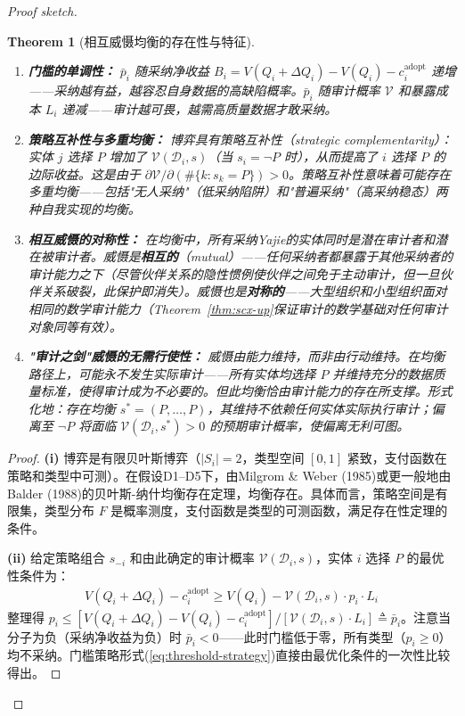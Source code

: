 \documentclass[12pt,a4paper]{ctexart}
\newtheorem{theorem}{Theorem}[section]
\theoremstyle{definition}
\theoremstyle{remark}
\begin{document}
\begin{proof}[Proof sketch]
\begin{theorem}[相互威慑均衡的存在性与特征]
\begin{enumerate}[label=(\roman*), itemsep=6pt]
\item \textbf{门槛的单调性：} $\bar{p}_i$ 随采纳净收益 $B_i = V(Q_i + \Delta Q_i) - V(Q_i) - c_i^{\text{adopt}}$ 递增——采纳越有益，越容忍自身数据的高缺陷概率。$\bar{p}_i$ 随审计概率 $\mathcal{V}$ 和暴露成本 $L_i$ 递减——审计越可畏，越需高质量数据才敢采纳。

\item \textbf{策略互补性与多重均衡：} 博弈具有策略互补性（strategic complementarity）：实体 $j$ 选择 $P$ 增加了 $\mathcal{V}(\mathcal{D}_i, s)$（当 $s_i = \neg P$ 时），从而提高了 $i$ 选择 $P$ 的边际收益。这是由于 $\partial \mathcal{V} / \partial (\#\{k: s_k = P\}) > 0$。策略互补性意味着可能存在多重均衡——包括"无人采纳"（低采纳陷阱）和"普遍采纳"（高采纳稳态）两种自我实现的均衡。

\item \textbf{相互威慑的对称性：} 在均衡中，\textit{所有}采纳Yajie的实体同时是潜在审计者和潜在被审计者。威慑是\textbf{相互的}（mutual）——任何采纳者都暴露于其他采纳者的审计能力之下（尽管伙伴关系的隐性惯例使伙伴之间免于主动审计，但一旦伙伴关系破裂，此保护即消失）。威慑也是\textbf{对称的}——大型组织和小型组织面对相同的数学审计能力（Theorem~\ref{thm:scx-up}保证审计的数学基础对任何审计对象同等有效）。

\item \textbf{"审计之剑"威慑的无需行使性：} 威慑由\textit{能力}维持，而非由\textit{行动}维持。在均衡路径上，可能\textit{永不}发生实际审计——所有实体均选择 $P$ 并维持充分的数据质量标准，使得审计成为不必要的。但此均衡恰由审计能力的存在所支撑。形式化地：存在均衡 $s^* = (P, \ldots, P)$，其维持不依赖任何实体实际执行审计；偏离至 $\neg P$ 将面临 $\mathcal{V}(\mathcal{D}_i, s^*) > 0$ 的预期审计概率，使偏离无利可图。
\end{enumerate}
\end{theorem}

\begin{proof}
\textbf{(i)} 博弈是有限贝叶斯博弈（$|S_i| = 2$，类型空间 $[0,1]$ 紧致，支付函数在策略和类型中可测）。在假设D1--D5下，由Milgrom \& Weber (1985)或更一般地由Balder (1988)的贝叶斯-纳什均衡存在定理，均衡存在。具体而言，策略空间是有限集，类型分布 $F$ 是概率测度，支付函数是类型的可测函数，满足存在性定理的条件。

\textbf{(ii)} 给定策略组合 $s_{-i}$ 和由此确定的审计概率 $\mathcal{V}(\mathcal{D}_i, s)$，实体 $i$ 选择 $P$ 的最优性条件为：
\begin{align}
V(Q_i + \Delta Q_i) - c_i^{\text{adopt}} \geq V(Q_i) - \mathcal{V}(\mathcal{D}_i, s) \cdot p_i \cdot L_i
\end{align}
整理得 $p_i \leq [V(Q_i + \Delta Q_i) - V(Q_i) - c_i^{\text{adopt}}] / [\mathcal{V}(\mathcal{D}_i, s) \cdot L_i] \triangleq \bar{p}_i$。注意当分子为负（采纳净收益为负）时 $\bar{p}_i < 0$——此时门槛低于零，所有类型（$p_i \geq 0$）均不采纳。门槛策略形式(\ref{eq:threshold-strategy})直接由最优化条件的一次性比较得出。


\end{proof}
\end{proof}
\end{document}

